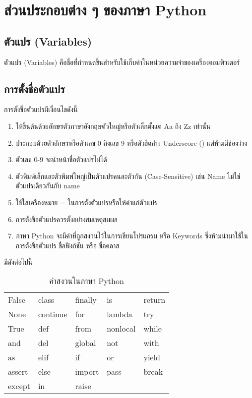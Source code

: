 \chapter{ส่วนประกอบต่าง ๆ ของภาษา Python}

\section{ตัวแปร (Variables)}

ตัวแปร (Variables) คือชื่อที่กำหนดขึ้นสำหรับใช้เก็บค่าในหน่วยความจำของเครื่องคอมพิวเตอร์

\section{การตั้งชื่อตัวแปร}

การตั้งชื่อตัวแปรมีเงื่อนไขดังนี้

\begin{enumerate}[noitemsep]
\item ให้ขึ้นต้นด้วยอักษรตัวภาษาอังกฤษตัวใหญ่หรือตัวเล็กตั้งแต่ Aa ถึง Zz เท่านั้น 
\item ประกอบด้วยตัวอักษรหรือตัวเลข 0 ถึงเลข 9 หรือตัวขีดล่าง Underscore (\pyinline{_}) แต่ห้ามมีช่องว่าง
\item ตัวเลข 0-9 จะนำหน้าชื่อตัวแปรไม่ได้
\item ตัวพิมพ์เล็กและตัวพิมพ์ใหญ่เป็นตัวแปรคนละตัวกัน (Case-Sensitive) เช่น Name ไม่ใช่ตัวแปรเดียวกันกับ name 
\item ใช้ใส่เครื่องหมาย = ในการตั้งตัวแปรหรือให้ค่าแก่ตัวแปร
\item การตั้งชื่อตัวแปรควรตั้งอย่างสมเหตุสมผล 
\item ภาษา Python จะมีคำที่ถูกสงวนไว้ในการเขียนโปรแกรม หรือ Keywords ซึ่งห้ามนำมาใช้ในการตั้งชื่อตัวแปร ชื่อฟังก์ชัน หรือ ชื่อคลาส
\end{enumerate}

มีดังต่อไปนี้ \cite{lutz2014}

\begin{table}
\centering
\begin{tabu}{l l l l l}
\rowfont{\ttfamily}
False & class & finally & is & return \\
\rowfont{\ttfamily}
None & continue & for & lambda & try \\
\rowfont{\ttfamily}
True & def & from & nonlocal & while \\
\rowfont{\ttfamily}
and & del & global & not & with \\
\rowfont{\ttfamily}
as & elif & if & or & yield \\
\rowfont{\ttfamily}
assert & else & import & pass & break \\
\rowfont{\ttfamily}
except & in & raise && \\
\end{tabu}
\caption{คำสงวนในภาษา Python}
\end{table}

